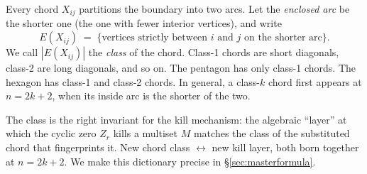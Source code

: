 \documentclass[11pt]{article}
\theoremstyle{definition}
\begin{document}
Every chord $X_{ij}$ partitions the boundary into two arcs. Let the \emph{enclosed arc} be the shorter one (the one with fewer interior vertices), and write
\[
E(X_{ij}) \;=\; \{\text{vertices strictly between $i$ and $j$ on the shorter arc}\}.
\]
We call $|E(X_{ij})|$ the \emph{class} of the chord. Class-1 chords are short diagonals, class-2 are long diagonals, and so on. The pentagon has only class-1 chords. The hexagon has class-1 and class-2 chords. In general, a class-$k$ chord first appears at $n = 2k+2$, when its inside arc is the shorter of the two.

\medskip

\begin{center}
\end{center}

\medskip
\noindent
The class is the right invariant for the kill mechanism: the algebraic ``layer'' at which the cyclic zero $Z_r$ kills a multiset $M$ matches the class of the substituted chord that fingerprints it. New chord class $\leftrightarrow$ new kill layer, both born together at $n = 2k+2$. We make this dictionary precise in \S\ref{sec:masterformula}.
\end{document}
